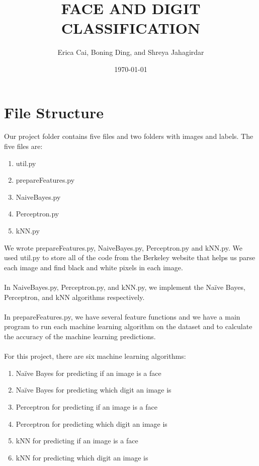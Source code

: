 \documentclass{article}
\title{FACE AND DIGIT CLASSIFICATION} %
\author{Erica Cai, Boning Ding, and Shreya Jahagirdar} %
\date{\today} %
\begin{document}
\maketitle %




\section{File Structure}

Our project folder contains five files and two folders with images and labels. The five files are:
\begin{enumerate}
	\item util.py
	\item prepareFeatures.py
	\item NaiveBayes.py
	\item Perceptron.py
	\item kNN.py
\end{enumerate}

We wrote prepareFeatures.py, NaiveBayes.py, Perceptron.py and kNN.py. We used util.py to store all of the code from the Berkeley website that helps us parse each image and find black and white pixels in each image. \\\\
In NaiveBayes.py, Perceptron.py, and kNN.py, we implement the Naïve Bayes, Perceptron, and kNN algorithms respectively. \\\\
In prepareFeatures.py, we have several feature functions and we have a main program to run each machine learning algorithm on the dataset and to calculate the accuracy of the machine learning predictions. \\\\
For this project, there are six machine learning algorithms: 
\begin{enumerate}
	\item Naïve Bayes for predicting if an image is a face
	\item Naïve Bayes for predicting which digit an image is
	\item Perceptron for predicting if an image is a face
	\item Perceptron for predicting which digit an image is
	\item kNN for predicting if an image is a face
	\item kNN for predicting which digit an image is
\end{enumerate}
\end{document}
